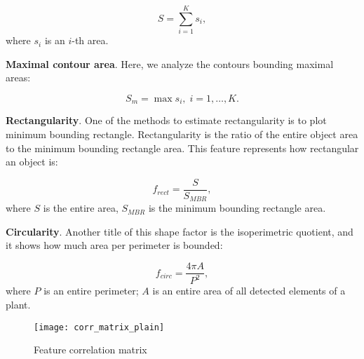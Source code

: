\begin{equation}
	\label{eq:4}
	 S = \sum_{i=1}^{K}s_i,
\end{equation}
where $s_i$ is an $i$-th area.

\vspace{1cm}

\textbf{Maximal contour area}. Here, we analyze the contours bounding maximal areas:

\begin{equation}
	\label{eq:5}
	 S_m = \max{s_i}, \; i = 1, \dots, K.
\end{equation}


\vspace{1cm}

\textbf{Rectangularity}. One of the methods to estimate rectangularity is to plot minimum bounding rectangle. Rectangularity is the ratio of the entire object area to the minimum bounding rectangle area. This feature represents how rectangular an object is:

\begin{equation}
	f_{rect} = \frac{S}{S_{MBR}},
	\label{eq:6}
\end{equation}
where $S$ is the entire area, $S_{MBR}$ is the minimum bounding rectangle area.

\vspace{1cm}

\textbf{Circularity}. Another title of this shape factor is the isoperimetric quotient, and it shows how much area per perimeter is bounded:

\begin{equation}
	f_{circ} = \frac{4 \pi A}{P^2},
	\label{eq:7}
\end{equation}
where $P$ is an entire perimeter; $A$ is an entire area of all detected elements of a plant.


\begin{figure}[h]
	\centering
	\texttt{[image: corr\_matrix\_plain]}
	\caption{Feature correlation matrix}
	\label{fig_corr_matrix}
\end{figure}


